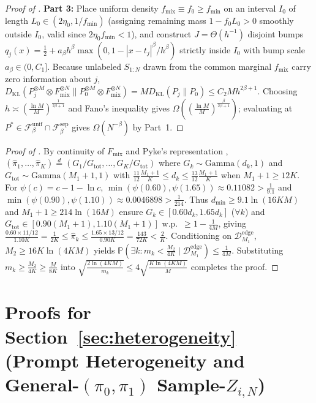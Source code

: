 \documentclass[10pt]{article}
\theoremstyle{plain}
\theoremstyle{definition}
\theoremstyle{remark}
\newcommand{\Prob}{\mathbb{P}}
\newcommand{\DKL}{D_{\mathrm{KL}}}
\newcommand{\Fmix}{F_{\mathrm{mix}}}
\newcommand{\fmix}{f_{\mathrm{mix}}}
\begin{document}
\begin{proof}[Proof of ]
\textbf{Part 3:} Place uniform density $\fmix \equiv f_0 \ge f_{\min}$ on an interval $I_0$ of length $L_0 \in (2\eta_0, 1/f_{\min})$ (assigning remaining mass $1 - f_0 L_0 > 0$ smoothly outside $I_0$, valid since $2\eta_0 f_{\min} < 1$), and construct $J = \Theta(h^{-1})$ disjoint bumps $q_j(x) = \frac{1}{2} + a_\beta h^\beta\max(0, 1 - |x-t_j|^\beta/h^\beta)$ strictly inside $I_0$ with bump scale $a_\beta \in (0, C_1]$. Because unlabeled $S_{1:N}$ drawn from the common marginal $\fmix$ carry zero information about $j$, $\DKL(P_j^{\otimes M}\otimes\Fmix^{\otimes N} \| P_0^{\otimes M}\otimes\Fmix^{\otimes N}) = M\DKL(P_j\|P_0) \le C_2 M h^{2\beta+1}$. Choosing $h \asymp (\frac{\ln M}{M})^{\frac{1}{2\beta+1}}$ and Fano's inequality gives $\Omega((\frac{\ln M}{M})^{\frac{\beta}{2\beta+1}})$; evaluating at $P^* \in \mathcal{F}_\beta^{\mathrm{unif}} \cap \mathcal{F}_\beta^{\mathrm{sep}}$ gives $\Omega(N^{-\beta})$ by Part~1.
\end{proof}

\begin{proof}[Proof of ]
By continuity of $\Fmix$ and Pyke's representation \citep{pyke1965spacings}, $(\hat{\pi}_1,\dots,\hat{\pi}_K) \stackrel{d}{=} (G_1/G_{\mathrm{tot}},\dots,G_K/G_{\mathrm{tot}})$ where $G_k \sim \mathrm{Gamma}(d_k, 1)$ and $G_{\mathrm{tot}} \sim \mathrm{Gamma}(M_1+1, 1)$ with $\frac{11}{12}\frac{M_1+1}{K} \le d_k \le \frac{13}{12}\frac{M_1+1}{K}$ when $M_1+1 \ge 12K$. For $\psi(c) = c - 1 - \ln c$, $\min(\psi(0.60), \psi(1.65)) \approx 0.11082 > \frac{1}{9.1}$ and $\min(\psi(0.90), \psi(1.10)) \approx 0.0046898 > \frac{1}{214}$. Thus $d_{\min} \ge 9.1\ln(16KM)$ and $M_1+1 \ge 214\ln(16M)$ ensure $G_k \in [0.60 d_k, 1.65 d_k]$ ($\forall k$) and $G_{\mathrm{tot}} \in [0.90(M_1+1), 1.10(M_1+1)]$ w.p.\ $\ge 1 - \frac{1}{4M}$, giving $\frac{0.60\times 11/12}{1.10 K} = \frac{1}{2K} \le \hat{\pi}_k \le \frac{1.65\times 13/12}{0.90 K} = \frac{143}{72K} < \frac{2}{K}$. Conditioning on $\mathcal{D}_{M_1}^{\mathrm{edge}}$, $M_2 \ge 16K\ln(4KM)$ yields $\Prob(\exists k: m_k < \frac{M_2}{4K} \mid \mathcal{D}_{M_1}^{\mathrm{edge}}) \le \frac{1}{4M}$. Substituting $m_k \ge \frac{M_2}{4K} \ge \frac{M}{8K}$ into $\sqrt{\frac{2\ln(4KM)}{m_k}} \le 4\sqrt{\frac{K\ln(4KM)}{M}}$ completes the proof.
\end{proof}

\section{Proofs for Section~\texorpdfstring{\ref{sec:heterogeneity}}{5} (Prompt Heterogeneity and General-\texorpdfstring{$(\pi_0,\pi_1)$}{(pi0, pi1)} Sample-\texorpdfstring{$Z_{i,N}$}{Z\_i,N})}
\label{app:heterogeneity}
\end{document}
